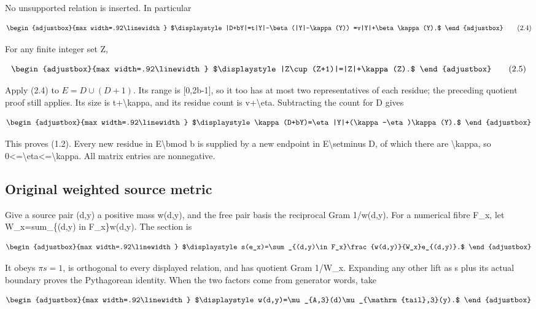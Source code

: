 No unsupported relation is inserted. In particular

\[
\begin{adjustbox}{max width=.92\linewidth}
$\displaystyle |D+bY|=t|Y|-\beta(|Y|-\kappa(Y))
=v|Y|+\beta\kappa(Y).$
\end{adjustbox}
\tag{2.4}
\]

For any finite integer set Z,

\[
\begin{adjustbox}{max width=.92\linewidth}
$\displaystyle |Z\cup(Z+1)|=|Z|+\kappa(Z).$
\end{adjustbox}
\tag{2.5}
\]

Apply (2.4) to \(E=D\cup(D+1)\). Its range is {[}0,2b-1{]}, so it too has at most two representatives of each residue; the preceding quotient proof still applies. Its size is t+\textbackslash kappa, and its residue count is v+\textbackslash eta. Subtracting the count for D gives

\[
\begin{adjustbox}{max width=.92\linewidth}
$\displaystyle \kappa(D+bY)=\eta|Y|+(\kappa-\eta)\kappa(Y).$
\end{adjustbox}
\]

This proves (1.2). Every new residue in E\textbackslash bmod b is supplied by a new endpoint in E\textbackslash setminus D, of which there are \textbackslash kappa, so 0\textless=\textbackslash eta\textless=\textbackslash kappa. All matrix entries are nonnegative.

\subsection{Original weighted source metric}\label{n22-original-weighted-source-metric}

Give a source pair (d,y) a positive mass w(d,y), and the free pair basis the reciprocal Gram 1/w(d,y). For a numerical fibre F\_x, let W\_x=sum\_\{(d,y) in F\_x\}w(d,y). The section is

\[
\begin{adjustbox}{max width=.92\linewidth}
$\displaystyle s(e_x)=\sum_{(d,y)\in F_x}\frac{w(d,y)}{W_x}e_{(d,y)}.$
\end{adjustbox}
\]

It obeys \(\pi s=1\), is orthogonal to every displayed relation, and has quotient Gram 1/W\_x. Expanding any other lift as s plus its actual boundary proves the Pythagorean identity. When the two factors come from generator words, take

\[
\begin{adjustbox}{max width=.92\linewidth}
$\displaystyle w(d,y)=\mu_{A,3}(d)\mu_{\mathrm{tail},3}(y).$
\end{adjustbox}
\]

